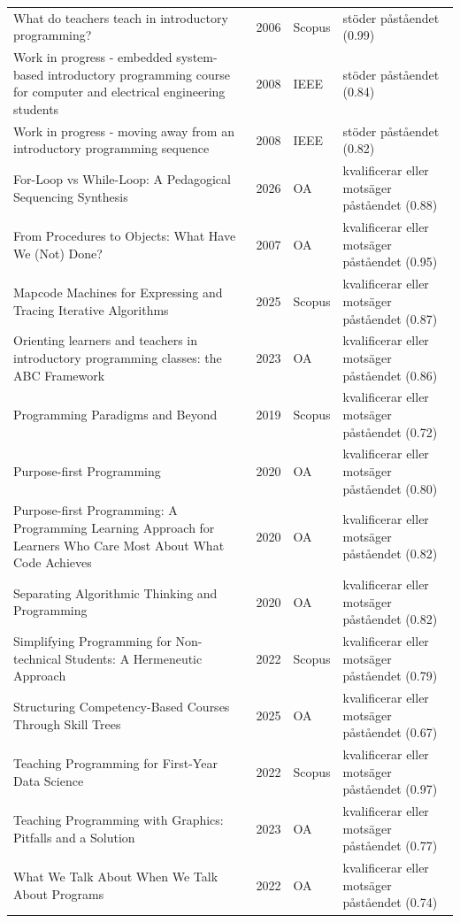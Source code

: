 \begin{longtable}{@{}%
  >{\raggedright\arraybackslash}p{}c%
  >{\raggedright\arraybackslash}p{}%
  >{\raggedright\arraybackslash}p{}@{}}
What do teachers teach in introductory programming? & 2006 & Scopus & stöder påståendet (0.99) \\
Work in progress - embedded system-based introductory programming course for computer and electrical engineering students & 2008 & IEEE & stöder påståendet (0.84) \\
Work in progress - moving away from an introductory programming sequence & 2008 & IEEE & stöder påståendet (0.82) \\
For-Loop vs While-Loop: A Pedagogical Sequencing Synthesis & 2026 & OA & kvalificerar eller motsäger påståendet (0.88) \\
From Procedures to Objects: What Have We (Not) Done? & 2007 & OA & kvalificerar eller motsäger påståendet (0.95) \\
Mapcode Machines for Expressing and Tracing Iterative Algorithms & 2025 & Scopus & kvalificerar eller motsäger påståendet (0.87) \\
Orienting learners and teachers in introductory programming classes: the ABC Framework & 2023 & OA & kvalificerar eller motsäger påståendet (0.86) \\
Programming Paradigms and Beyond & 2019 & Scopus & kvalificerar eller motsäger påståendet (0.72) \\
Purpose-first Programming & 2020 & OA & kvalificerar eller motsäger påståendet (0.80) \\
Purpose-first Programming: A Programming Learning Approach for Learners Who Care Most About What Code Achieves & 2020 & OA & kvalificerar eller motsäger påståendet (0.82) \\
Separating Algorithmic Thinking and Programming & 2020 & OA & kvalificerar eller motsäger påståendet (0.82) \\
Simplifying Programming for Non-technical Students: A Hermeneutic Approach & 2022 & Scopus & kvalificerar eller motsäger påståendet (0.79) \\
Structuring Competency-Based Courses Through Skill Trees & 2025 & OA & kvalificerar eller motsäger påståendet (0.67) \\
Teaching Programming for First-Year Data Science & 2022 & Scopus & kvalificerar eller motsäger påståendet (0.97) \\
Teaching Programming with Graphics: Pitfalls and a Solution & 2023 & OA & kvalificerar eller motsäger påståendet (0.77) \\
What We Talk About When We Talk About Programs & 2022 & OA & kvalificerar eller motsäger påståendet (0.74) \\
\end{longtable}
\endgroup
